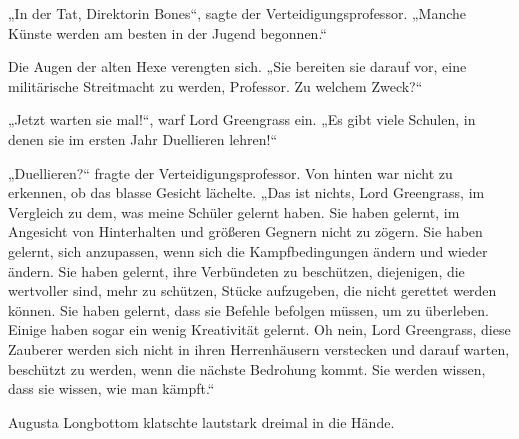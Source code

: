 „In der Tat, Direktorin Bones“, sagte der Verteidigungsprofessor.
„Manche Künste werden am besten in der Jugend begonnen.“

Die Augen der alten Hexe verengten sich.
„Sie bereiten sie darauf vor, eine militärische Streitmacht zu werden, Professor. Zu welchem Zweck?“

„Jetzt warten sie mal!“, warf Lord Greengrass ein.
„Es gibt viele Schulen, in denen sie im ersten Jahr Duellieren lehren!“

„Duellieren?“ fragte der Verteidigungsprofessor. Von hinten war nicht zu erkennen, ob das blasse Gesicht lächelte.
„Das ist nichts, Lord Greengrass, im Vergleich zu dem, was meine Schüler gelernt haben. Sie haben gelernt, im Angesicht von Hinterhalten und größeren Gegnern nicht zu zögern. Sie haben gelernt, sich anzupassen, wenn sich die Kampfbedingungen ändern und wieder ändern. Sie haben gelernt, ihre Verbündeten zu beschützen, diejenigen, die wertvoller sind, mehr zu schützen, Stücke aufzugeben, die nicht gerettet werden können. Sie haben gelernt, dass sie Befehle befolgen müssen, um zu überleben. Einige haben sogar ein wenig Kreativität gelernt. Oh nein, Lord Greengrass, diese Zauberer werden sich nicht in ihren Herrenhäusern verstecken und darauf warten, beschützt zu werden, wenn die nächste Bedrohung kommt. Sie werden wissen, dass sie wissen, wie man kämpft.“

Augusta Longbottom klatschte lautstark dreimal in die Hände.


